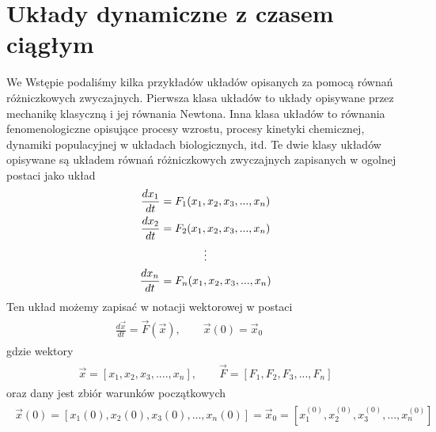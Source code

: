 \documentclass[a4paper,12pt,polish]{sphinxmanual}
\begin{document}
\section{Układy dynamiczne z czasem ciągłym}
\label{ch1/chI021::doc}\label{ch1/chI021:uklady-dynamiczne-z-czasem-ciaglym}
We Wstępie podaliśmy kilka przykładów układów opisanych za pomocą równań różniczkowych zwyczajnych. Pierwsza klasa układów to  układy opisywane przez  mechanikę klasyczną i jej  równania Newtona. Inna klasa układów to równania fenomenologiczne opisujące procesy wzrostu, procesy kinetyki chemicznej, dynamiki populacyjnej w układach biologicznych, itd. Te dwie klasy układów opisywane są układem równań różniczkowych zwyczajnych zapisanych w ogolnej postaci jako układ
\label{ch1/chI021:equation-eqn1}\begin{gather}
\begin{split}\frac{dx_1}{dt} = F_1(x_1, x_2, x_3, ..., x_n)\end{split}\label{ch1/chI021-eqn1}\\\begin{split}\frac{dx_2}{dt} = F_2(x_1, x_2, x_3, ..., x_n)\end{split}\notag\\\begin{split}\vdots\end{split}\notag\\\begin{split}\frac{dx_n}{dt} = F_n(x_1, x_2, x_3, ..., x_n)\end{split}\notag
\end{gather}
Ten układ możemy zapisać w notacji wektorowej w  postaci
\label{ch1/chI021:equation-eqn5}\begin{gather}
\begin{split}\frac{d\vec x}{dt} = \vec F(\vec x), \quad \quad \vec x(0)  = \vec x_0  \qquad \quad\end{split}\label{ch1/chI021-eqn5}
\end{gather}
gdzie wektory
\label{ch1/chI021:equation-eqn6}\begin{gather}
\begin{split}\vec x = [x_1, x_2, x_3, ...., x_n], \quad \quad \vec F = [F_1, F_2, F_3, ..., F_n]\end{split}\label{ch1/chI021-eqn6}
\end{gather}
oraz dany jest zbiór warunków początkowych
\label{ch1/chI021:equation-eqn7}\begin{gather}
\begin{split}\vec x(0) = [x_1(0), x_2(0), x_3(0), ... , x_n(0)] = \vec x_0 = [x_1^{(0)}, x_2^{(0)}, x_3^{(0)}, ... ,  x_n^{(0)}]\end{split}\label{ch1/chI021-eqn7}
\end{gather}
\end{document}
